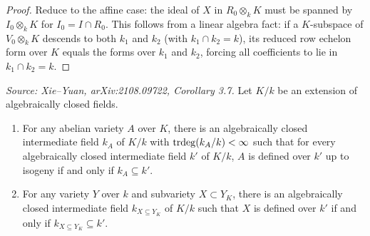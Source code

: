 \begin{proof}
  Reduce to the affine case: the ideal of \(X\) in \(R_0 \otimes_k K\) must be spanned by
  \(I_0 \otimes_k K\) for \(I_0 = I \cap R_0\).  This follows from a linear algebra fact:
  if a \(K\)-subspace of \(V_0 \otimes_k K\) descends to both \(k_1\) and \(k_2\) (with
  \(k_1 \cap k_2 = k\)), its reduced row echelon form over \(K\) equals the forms over
  \(k_1\) and \(k_2\), forcing all coefficients to lie in \(k_1 \cap k_2 = k\).
\end{proof}

\begin{corollary}
  \label{cor:defField}
  \textit{Source: Xie--Yuan, arXiv:2108.09722, Corollary 3.7.}
  Let \(K/k\) be an extension of algebraically closed fields.
  \begin{enumerate}
    \item For any abelian variety \(A\) over \(K\), there is an algebraically closed
          intermediate field \(k_A\) of \(K/k\) with \(\operatorname{trdeg}(k_A/k) < \infty\) such that
          for every algebraically closed intermediate field \(k'\) of \(K/k\),
          \(A\) is defined over \(k'\) up to isogeny if and only if \(k_A \subseteq k'\).
    \item For any variety \(Y\) over \(k\) and subvariety \(X \subset Y_K\), there is an
          algebraically closed intermediate field \(k_{X \subseteq Y_K}\) of \(K/k\) such
          that \(X\) is defined over \(k'\) if and only if \(k_{X \subseteq Y_K} \subseteq k'\).
  \end{enumerate}
\end{corollary}

